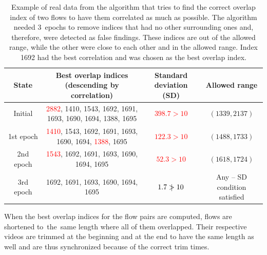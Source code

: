 \begin{table}[!ht]
    \begin{center}
        \begin{tabular}{ |c|c|c|c| }
            \hline
            State & \makecell{Best overlap indices \\ (descending by correlation)} & \makecell{Standard \\ deviation (SD)} & Allowed range \\
            \hline
            \hline
                Initial & \makecell{\textcolor{red}{2882}, 1410, 1543, 1692, 1691,\\1693, 1690, 1694, 1388, 1695} & \textcolor{red}{$398.7 > 10$} & $(1339, 2137)$ \\
            \hline
                1st epoch & \makecell{\textcolor{red}{1410}, 1543, 1692, 1691, 1693,\\1690, 1694, \textcolor{red}{1388}, 1695} & \textcolor{red}{$122.3 > 10$} & $(1488, 1733)$ \\
            \hline
                2nd epoch & \makecell{\textcolor{red}{1543}, 1692, 1691, 1693, 1690,\\1694, 1695} & \textcolor{red}{$52.3 > 10$} & $(1618, 1724)$ \\
            \hline
                3rd epoch & \makecell{\textcolor{hrcolor-cite}{1692}, 1691, 1693, 1690, 1694,\\1695} & \textcolor{hrcolor-cite}{$1.7 \mathrel{\ooalign{$>$\cr\hidewidth$|$\hidewidth}} 10$} & \makecell{Any -- SD \\ condition satisfied} \\
            \hline
        \end{tabular}
    \end{center}
    \caption{Example of real data from the algorithm that tries to find the correct overlap index of two flows to have them correlated as much as possible. The algorithm needed 3~epochs to remove indices that had no other surrounding ones and, therefore, were detected as false findings. These indices are out of the allowed range, while the other were close to each other and in the allowed range. Index 1692 had the best correlation and was chosen as the best overlap index.}
    \label{tab:correlation-pick}
\end{table}

When the best overlap indices for the flow pairs are computed, flows are shortened to~the~same length where all of them overlapped. Their respective videos are trimmed at the beginning and at the end to have the same length as well and are thus synchronized because of the correct trim times.

